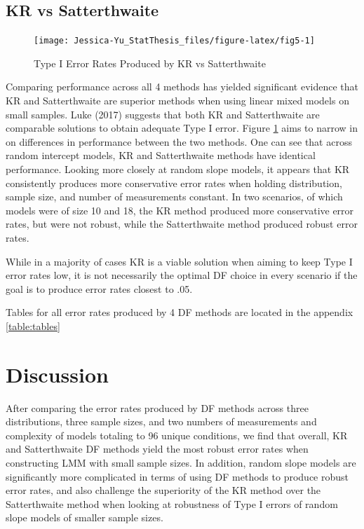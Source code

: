 \documentclass[12pt, twoside]{amherstthesis}
\begin{document}
\hypertarget{kr-vs-satterthwaite}{%
\subsection{KR vs Satterthwaite}\label{kr-vs-satterthwaite}}
\begin{figure}

{\centering \texttt{[image: Jessica-Yu\_StatThesis\_files/figure-latex/fig5-1]} 

}

\caption{Type I Error Rates Produced by KR vs Satterthwaite}\label{fig:fig5}
\end{figure}
Comparing performance across all 4 methods has yielded significant evidence that KR and Satterthwaite are superior methods when using linear mixed models on small samples. Luke (2017) suggests that both KR and Satterthwaite are comparable solutions to obtain adequate Type I error. Figure \ref{fig:fig5} aims to narrow in on differences in performance between the two methods. One can see that across random intercept models, KR and Satterthwaite methods have identical performance. Looking more closely at random slope models, it appears that KR consistently produces more conservative error rates when holding distribution, sample size, and number of measurements constant. In two scenarios, of which models were of size 10 and 18, the KR method produced more conservative error rates, but were not robust, while the Satterthwaite method produced robust error rates.

While in a majority of cases KR is a viable solution when aiming to keep Type I error rates low, it is not necessarily the optimal DF choice in every scenario if the goal is to produce error rates closest to .05.

Tables for all error rates produced by 4 DF methods are located in the appendix \ref{table:tables}

\hypertarget{discussion}{%
\section{Discussion}\label{discussion}}

After comparing the error rates produced by DF methods across three distributions, three sample sizes, and two numbers of measurements and complexity of models totaling to 96 unique conditions, we find that overall, KR and Satterthwaite DF methods yield the most robust error rates when constructing LMM with small sample sizes. In addition, random slope models are significantly more complicated in terms of using DF methods to produce robust error rates, and also challenge the superiority of the KR method over the Satterthwaite method when looking at robustness of Type I errors of random slope models of smaller sample sizes.
\end{document}
